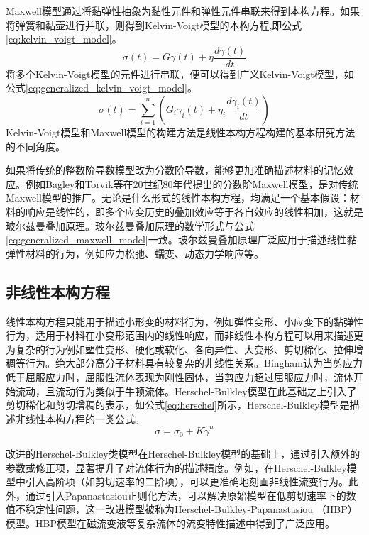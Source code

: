 Maxwell模型通过将黏弹性抽象为黏性元件和弹性元件串联来得到本构方程。如果将弹簧和黏壶进行并联，则得到Kelvin-Voigt模型的本构方程,即公式\eqref{eq:kelvin_voigt_model}\cite{voigt1892ueber}。
\begin{equation}
  \sigma(t) = G \gamma(t) + \eta \frac{d\gamma(t)}{dt} \label{eq:kelvin_voigt_model}
\end{equation}
将多个Kelvin-Voigt模型的元件进行串联，便可以得到广义Kelvin-Voigt模型，如公式\eqref{eq:generalized_kelvin_voigt_model}。
\begin{equation}
  \sigma(t) = \sum_{i=1}^{n} \left( G_i \gamma_i(t) + \eta_i \frac{d\gamma_i(t)}{dt} \right)\label{eq:generalized_kelvin_voigt_model}
\end{equation}
Kelvin-Voigt模型和Maxwell模型的构建方法是线性本构方程构建的基本研究方法的不同角度\cite{ricarteTutorialReviewLinear2024}。

如果将传统的整数阶导数模型改为分数阶导数，能够更加准确描述材料的记忆效应。例如Bagley和Torvik等在20世纪80年代提出的分数阶Maxwell模型，是对传统Maxwell模型的推广\cite{bagley1986fractional}。无论是什么形式的线性本构方程，均满足一个基本假设：材料的响应是线性的，即多个应变历史的叠加效应等于各自效应的线性相加，这就是玻尔兹曼叠加原理\cite{boltzmannZurTheorieElastischen1878}。玻尔兹曼叠加原理的数学形式与公式\eqref{eq:generalized_maxwell_model}一致。玻尔兹曼叠加原理广泛应用于描述线性黏弹性材料的行为，例如应力松弛、蠕变、动态力学响应等\cite{boltzmannZurTheorieElastischen1878}。
\subsection{非线性本构方程}
线性本构方程只能用于描述小形变的材料行为，例如弹性变形、小应变下的黏弹性行为\cite{fedorowiczElasticPerfectlyPlastic2024,lingComparisonReviewClassical2023,ricarteTutorialReviewLinear2024}，适用于材料在小变形范围内的线性响应，而非线性本构方程可以用来描述更为复杂的行为例如塑性变形、硬化或软化、各向异性、大变形、剪切稀化、拉伸增稠等行为。绝大部分高分子材料具有较复杂的非线性关系。Bingham认为当剪应力低于屈服应力时，屈服性流体表现为刚性固体，当剪应力超过屈服应力时，流体开始流动，且流动行为类似于牛顿流体\cite{binghaminvestigation}。Herschel-Bulkley模型在此基础之上引入了剪切稀化和剪切增稠的表示，如公式\eqref{eq:herschel}所示，Herschel-Bulkley模型是描述非线性本构方程的一类公式\cite{herschel1926konsistenzmessungen}。
\begin{equation}
  \sigma=\sigma_0+K\dot{\gamma}^n \label{eq:herschel}
\end{equation}

改进的Herschel-Bulkley类模型在Herschel-Bulkley模型的基础上，通过引入额外的参数或修正项，显著提升了对流体行为的描述精度。例如，在Herschel-Bulkley模型中引入高阶项（如剪切速率的二阶项），可以更准确地刻画非线性流变行为\cite{magnon2021precise}。此外，通过引入Papanastasiou正则化方法，可以解决原始模型在低剪切速率下的数值不稳定性问题，这一改进模型被称为Herschel-Bulkley-Papanastasiou （HBP） 模型。HBP模型在磁流变液等复杂流体的流变特性描述中得到了广泛应用\cite{papanastasiou1987flows}。

